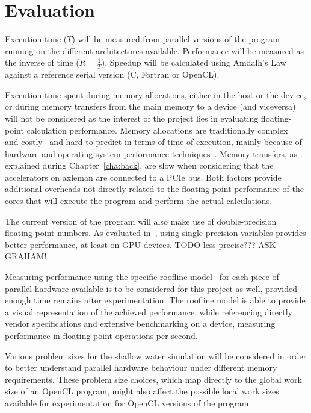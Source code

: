 \section{Evaluation}

Execution time ($T$) will be measured from parallel versions of the program running on the different architectures available. Performance will be measured as the inverse of time ($R = \frac{1}{T}$). Speedup will be calculated using Amdalh's Law~\cite{eager1989speedup} against a reference serial version (C, Fortran or OpenCL).

Execution time spent during memory allocations, either in the host or the device, or during memory transfers from the main memory to a device (and viceversa) will not be considered as the interest of the project lies in evaluating floating-point calculation performance. Memory allocations are traditionally complex~\cite{arpaci2012operating} and costly~\cite{detlefs1994memory} and hard to predict in terms of time of execution, mainly because of hardware and operating system performance techniques~\cite{herter2014timing}. Memory transfers, as explained during Chapter~\ref{cha:back}, are slow when considering that the accelerators on axleman are connected to a PCIe bus. Both factors provide additional overheads not directly related to the floating-point performance of the cores that will execute the program and perform the actual calculations.

The current version of the program will also make use of double-precision floating-point numbers. As evaluated in~\cite{pappas2012}, using single-precision variables provides better performance, at least on GPU devices. TODO less precise??? ASK GRAHAM!

Measuring performance using the specific roofline model~\cite{williams2009roofline} for each piece of parallel hardware available is to be considered for this project as well, provided enough time remains after experimentation. The roofline model is able to provide a visual representation of the achieved performance, while referencing directly vendor specifications and extensive benchmarking on a device, measuring performance in floating-point operations per second.

Various problem sizes for the shallow water simulation will be considered in order to better understand parallel hardware behaviour under different memory requirements. These problem size choices, which map directly to the global work size of an OpenCL program, might also affect the possible local work sizes available for experimentation for OpenCL versions of the program.

